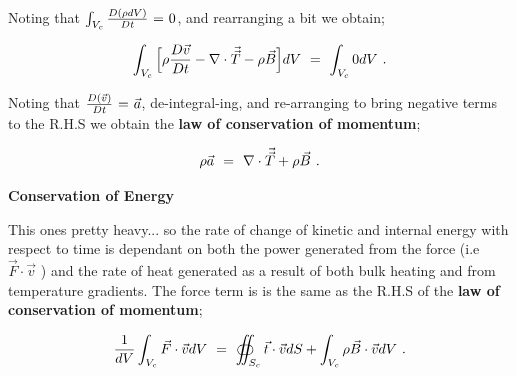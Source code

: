 \documentclass{article}
\begin{document}
Noting that \begin{math} \int_{V_c} \frac{D ( \rho dV )}{D t} \hspace{0.025cm} = \hspace{0.025cm} 0 \end{math}, and rearranging a bit we obtain;

\begin{equation} \label{eb-eq-1-130}
 \int_{V_c} \Big[ \rho \frac{D  \vec{v}}{D t}  - \nabla \cdot \vec{\vec{T}} - \rho \vec{B} \Big] dV \hspace{0.125cm} = \hspace{0.125cm}  \int_{V_c} 0 dV \hspace{0.125cm}  . 
\end{equation} 

Noting that \begin{math} \frac{D ( \vec{v} )}{D t} \hspace{0.025cm} = \hspace{0.025cm} \vec{a} \end{math}, de-integral-ing, and re-arranging to bring negative terms to the R.H.S we obtain the \textbf{law of conservation of momentum};

\begin{equation} \label{eb-eq-1-131}
\rho \vec{a} \hspace{0.125cm} = \hspace{0.125cm} \nabla \cdot \vec{\vec{T}} + \rho \vec{B} \hspace{0.125cm}  . 
\end{equation} 


\vspace{0.5cm}

\textbf{Conservation of Energy}

This ones pretty heavy... so the rate of change of kinetic and internal energy with respect to time is dependant on both the power generated from the force (i.e \begin{math} \vec{F} \cdot \vec{v} \end{math} ) and the rate of heat generated as a result of both bulk heating and from temperature gradients. The force term is is the same as the R.H.S of the \textbf{law of conservation of momentum};

\begin{equation} \label{eb-eq-1-132}
\frac{1}{dV} \int_{V_c} \vec{F} \cdot \vec{v} dV \hspace{0.125cm} = \hspace{0.125cm} \oiint_{S_c} \vec{t} \cdot \vec{v} dS + \int_{V_c} \rho \vec{B} \cdot \vec{v} dV \hspace{0.125cm}  . 
\end{equation} 
\end{document}
